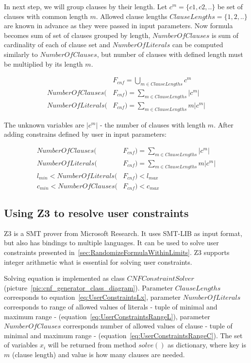 In next step, we will group clauses by their length. Let $c^m = \{c1,c2,..\}$ be set of clauses with common length $m$. Allowed clause lengths $ClauseLengths=\{1,2,..\}$ are known in advance as they were passed in input parameters. Now formula becomes sum of set of clauses grouped by length, $NumberOfClauses$ is sum of cardinality of each of clause set and $NumberOfLiterals$ can be computed similarly to $NumberOfClauses$, but number of clauses with defined length must be multiplied by its length $m$.

\begin{align*}
  &F_{cnf} = \bigcup_{m \in ClauseLengths} c^m \\
  NumberOfClauses(&F_{cnf}) = \sum_{m \in ClauseLengths} |c^m| \\
  NumberOfLiterals(&F_{cnf}) = \sum_{m \in ClauseLengths} m |c^m| 
\end{align*}

The unknown variables are $|c^m|$ - the number of clauses with length $m$. After adding constrains defined by user in input parameters:

\begin{align}
  NumberOfClauses(&F_{cnf}) = \sum_{m \in ClauseLengths} |c^m| \label{eq:UserConstraintsX}\\
  NumberOfLiterals(&F_{cnf}) = \sum_{m \in ClauseLengths} m |c^m| \label{eq:UserConstraintsLx} \\
  l_{min} < NumberOfLiterals(&F_{cnf})< l_{max} \label{eq:UserConstraintsRangeL}\\
  c_{min} < NumberOfClauses(&F_{cnf}) < c_{max}\label{eq:UserConstraintsRangeC} 
\end{align}

\subsection{Using Z3 to resolve user constraints}
\label{sec:Z3}

Z3 \cite{Z3Solver} is a \gls{SMT} prover from Microsoft Research. It uses SMT-LIB as input format, but also has bindings to multiple languages. It can be used to solve user constraints presented in~\ref{sec:RandomizeFormulaWithinLimits}. Z3 supports integer arithmetic what is essential for solving user constraints.

Solving equation is implemented as class $CNFConstraintSolver$ (picture~\ref{pic:cnf_generator_class_diagram}). Parameter $ClauseLengths$ corresponds to equation~\ref{eq:UserConstraintsLx}, parameter $NumberOfLiterals$ corresponds to range of allowed values of literals - tuple of minimal and maximum range - (equation~\ref{eq:UserConstraintsRangeL}), parameter $NumberOfClauses$ corresponds number of allowed values of clause - tuple of minimal and maximum range - (equation~\ref{eq:UserConstraintsRangeC}). The set of variables $x_i$ will be returned from method $solve()$ as dictionary, where key is $m$ (clause length) and value is how many clauses are needed.


